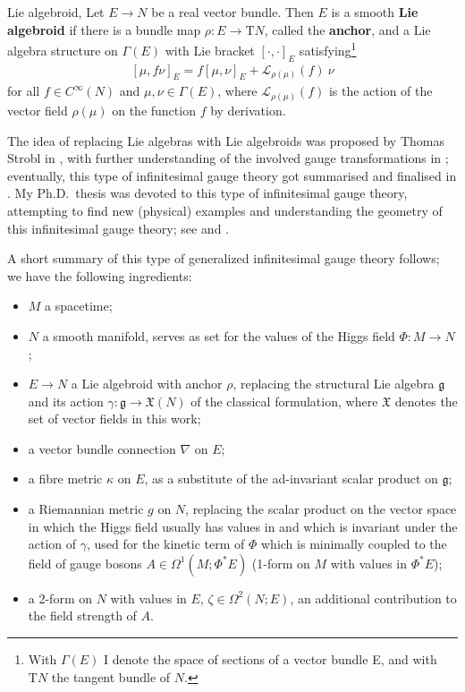 \documentclass[a4paper,oneside,11pt]{scrartcl} %
\theoremstyle{plain}
\theoremstyle{remark}
\theoremstyle{definition}
\begin{document}
\begin{definitions*}{Lie algebroid,  \cite[reduced definition of \S 16.1, page 113]{DaSilva}}
Let $E \to N$ be a real vector bundle. Then $E$ is a smooth \textbf{Lie algebroid} if there is a bundle map $\rho: E \to \mathrm{T}N$, called the \textbf{anchor}, and a Lie algebra structure on $\Gamma(E)$ with Lie bracket $\left[ \cdot, \cdot \right]_E$ satisfying\footnote{With $\Gamma(E)$ I denote the space of sections of a vector bundle E, and with $\mathrm{T}N$ the tangent bundle of $N$.}
\begin{align*}
  \left[\mu, f \nu\right]_E = f \left[\mu, \nu\right]_E + \mathcal{L}_{\rho(\mu)}(f) ~ \nu
\end{align*}
for all $f \in C^\infty(N)$ and $\mu, \nu \in \Gamma(E)$, where $\mathcal{L}_{\rho(\mu)}(f)$ is the action of the vector field $\rho(\mu)$ on the function $f$ by derivation.
\end{definitions*}

The idea of replacing Lie algebras with Lie algebroids was proposed by Thomas Strobl in \cite{OriginofCYMH}, with further understanding of the involved gauge transformations in \cite{mayer2009lie}; eventually, this type of infinitesimal gauge theory got summarised and finalised in \cite{CurvedYMH}. My Ph.D.\ thesis was devoted to this type of infinitesimal gauge theory, attempting to find new (physical) examples and understanding the geometry of this infinitesimal gauge theory; see \cite{My1stpaper} and \cite{MyThesis}.

A short summary of this type of generalized infinitesimal gauge theory follows; we have the following ingredients:
\begin{itemize}
	\item $M$ a spacetime;
	\item $N$ a smooth manifold, serves as set for the values of the Higgs field $\Phi: M \to N$;
	\item $E \to N$ a Lie algebroid with anchor $\rho$, replacing the structural Lie algebra $\mathfrak{g}$ and its action $\gamma: \mathfrak{g} \to \mathfrak{X}(N)$ of the classical formulation, where $\mathfrak{X}$ denotes the set of vector fields in this work;
	\item a vector bundle connection $\nabla$ on $E$;
	\item a fibre metric $\kappa$ on $E$, as a substitute of the ad-invariant scalar product on $\mathfrak{g}$;
	\item a Riemannian metric $g$ on $N$, replacing the scalar product on the vector space in which the Higgs field usually has values in and which is invariant under the action of $\gamma$, used for the kinetic term of $\Phi$ which is minimally coupled to the field of gauge bosons $A \in \Omega^1(M; \Phi^*E)$ (1-form on $M$ with values in $\Phi^*E$);
	\item a 2-form on $N$ with values in $E$, $\zeta \in \Omega^2(N;E)$, an additional contribution to the field strength of $A$.
\end{itemize}
\end{document}
